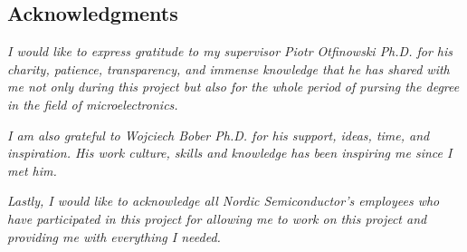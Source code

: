 
\vspace*{2cm}
\begin{addmargin}[1em]{1em}%
\hspace{8mm}
\begin{center}
\subsection*{Acknowledgments}
\end{center}
\large
\hspace{0.55cm}
\textit{I would like to express gratitude to my supervisor Piotr Otfinowski Ph.D. for his charity, patience, transparency, 
and immense knowledge that he has shared with me not only during this project but also for the whole period of 
pursing the degree in the field of microelectronics.}

\textit{I am also grateful to Wojciech Bober Ph.D. for his support, ideas, time, and inspiration. His work culture,
skills and knowledge has been inspiring me since I met him.}

\textit{Lastly, I would like to acknowledge all Nordic Semiconductor's employees who have participated in this project 
for allowing me to work on this project and providing me with everything I needed.}
\end{addmargin}
\vspace{2cm}